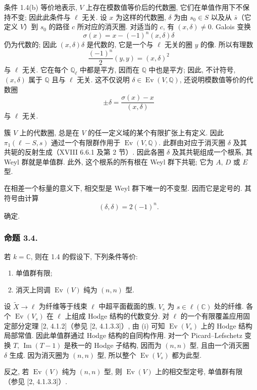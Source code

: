 条件 1.4(b) 等价地表示, $V$ 上存在模数值等价后的代数圈, 它们在单值作用下不保持不变; 因此此条件与 $\ell$ 无关. 设 $x$ 为这样的代数圈, $\delta$ 为由 $s_0\in S$ 以及从 $\bar s$（它定义 $V$）到 $s_0$ 的路径 $c$ 所对应的消灭圈. 对适当的 $c$, 有 $(x,\delta)\ne0$. Galois 变换
\[
  \sigma(x)=x-(-1)^n(x,\delta)\delta
\]
仍为代数的; 因此 $(x,\delta)\delta$ 是代数的, 它是一个与 $\ell$ 无关的圈 $y$ 的像. 所以有理数
\[
  \frac{(-1)^n}{2}(y,y)=(x,\delta)^2
\]
与 $\ell$ 无关. 它在每个 $\mathbb Q_\ell$ 中都是平方, 因而在 $\mathbb Q$ 中也是平方; 因此, 不计符号, $(x,\delta)$ 属于 $\mathbb Q$ 且与 $\ell$ 无关. 这不仅说明 $\delta\in\operatorname{Ev}(V,\mathbb Q)$, 还说明模数值等价的代数圈
\[
  \pm\delta=\frac{\sigma(x)-x}{(x,\delta)}
\]
与 $\ell$ 无关.

簇 $V$ 上的代数圈, 总是在 $V$ 的任一定义域的某个有限扩张上有定义. 因此 $\pi_1(\ell-S,s)$ 通过一个有限群作用于 $\operatorname{Ev}(V,\mathbb Q)$. 此群由对应于消灭圈 $\delta$ 及其共轭的反射生成（XVIII 6.6.1 及第 2 节）. 因此各圈 $\delta$ 及其共轭组成一个根系, 其 Weyl 群就是单值群. 此外, 这个根系的所有根在 Weyl 群下共轭; 它为 $A$, $D$ 或 $E$ 型.

在相差一个标量的意义下, 相交型是 Weyl 群下唯一的不变型. 因而它是定号的. 其符号由计算
\[
  (\delta,\delta)=2(-1)^n.
\]
确定.

\subsubsection*{命题 3.4.}
若 $k=\mathbb C$, 则在 1.4 的假设下, 下列条件等价:
\begin{enumerate}[label=(\roman*)]
\item 单值群有限;
\item 消灭上同调 $\operatorname{Ev}(V)$ 纯为 $(n,n)$ 型.
\end{enumerate}

设 $\widetilde X\to\ell$ 为纤维等于线束 $\ell$ 中超平面截面的族, $V_s$ 为 $s\in\ell(\mathbb C)$ 处的纤维. 各个 $\operatorname{Ev}(V_s)$ 在 $\ell$ 上组成 Hodge 结构的代数变分. 对 $\ell$ 的一个有限覆盖应用固定部分定理 [2, 4.1.2]（参见 [2, 4.1.3.3]）, 由 (i) 可知 $\operatorname{Ev}(V_s)$ 上的 Hodge 结构局部常值. 因此单值群通过 Hodge 结构的自同构作用. 对一个 Picard--Lefschetz 变换 $T$, $\operatorname{Im}(T-1)$ 是秩一的 Hodge 子结构, 因而为 $(n,n)$ 型, 且由一个消灭圈 $\delta$ 生成. 因为消灭圈为 $(n,n)$ 型, 所以整个 $\operatorname{Ev}(V_s)$ 都为此型.

反之, 若 $\operatorname{Ev}(V)$ 纯为 $(n,n)$ 型, 则 $\operatorname{Ev}(V)$ 上的相交型定号, 单值群有限（参见 [2, 4.1.3.3]）.

